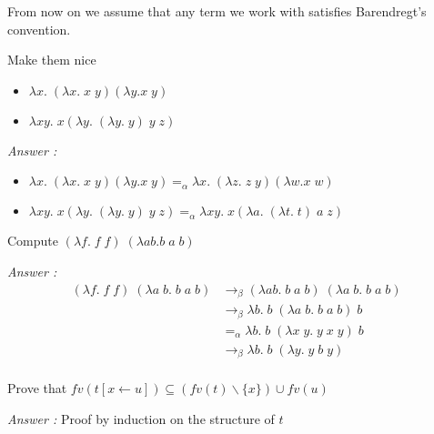   From now on we assume that any term we work with satisfies Barendregt’s
  convention.

  \exo Make them nice
    \begin{itemize}
      \item $\lambda x.\; (\lambda x.\; x\; y) (\lambda y. x\; y)$
      \item $\lambda x y.\; x (\lambda y.\; (\lambda y.\; y)\; y\; z)$
    \end{itemize}

  \textit{Answer :}
    \begin{itemize}
      \item $\lambda x.\; (\lambda x.\; x\; y) (\lambda y. x\; y) =_\alpha
        \lambda x.\; (\lambda z.\; z\; y) (\lambda w. x\; w)$
      \item $\lambda x y.\; x (\lambda y.\; (\lambda y.\; y)\; y\; z) =_\alpha
        \lambda x y.\; x (\lambda a.\; (\lambda t.\; t)\; a\; z)$
    \end{itemize}

  \exo Compute $(\lambda f.\; f\;f)\; (\lambda a b. b\;a\;b)$

  \textit{Answer :}
    \begin{align*}
      (\lambda f.\;f\;f)\; (\lambda a\; b.\;b\;a\;b) &\to_\beta
      (\lambda a b.\;b\;a\;b)\; (\lambda a\;b.\;b\;a\;b) \\
      &\to_\beta \lambda b.\;b\;(\lambda a\;b.\;b\;a\;b)\;b\\
      &=_\alpha \lambda b.\;b\;(\lambda x\;y.\;y\;x\;y)\;b\\
      &\to_\beta \lambda b.\;b\;(\lambda y.\;y\;b\;y)\\
    \end{align*}


  \exo Prove that $fv(t[x \leftarrow u]) \subseteq (fv(t) \backslash \{x\})
    \cup fv(u)$

  \textit{Answer :} Proof by induction on the structure of $t$

